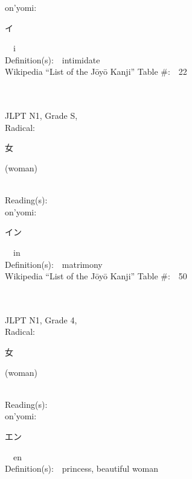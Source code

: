 \begin{multicols}{2}
{\hspace*{1em}}on'yomi:\ \ \\
{\hspace*{2em}}{\begin{CJK}{UTF8}{min} イ \end{CJK}}\ \ i\ \ \\
Definition(s):\ \ intimidate \\
Wikipedia ``List of the J\=oy\=o Kanji'' Table \#:\ \     22 \\
\ \ \\
{\fontsize{34pt}{40pt}  }\ \ \\
{JLPT N1, Grade S, \\Radical:\ \ {\begin{CJK}{UTF8}{min} 女 \end{CJK}} (woman) } \\
Reading(s):\ \ \\
{\hspace*{1em}}on'yomi:\ \ \\
{\hspace*{2em}}{\begin{CJK}{UTF8}{min} イン \end{CJK}}\ \ in\ \ \\
Definition(s):\ \ matrimony \\
Wikipedia ``List of the J\=oy\=o Kanji'' Table \#:\ \ 50 \\
\ \ \\
{\fontsize{34pt}{40pt}  }\ \ \\  %
{JLPT N1, Grade 4, \\Radical:\ \ {\begin{CJK}{UTF8}{min} 女 \end{CJK}} (woman) } \\
Reading(s):\ \ \\
{\hspace*{1em}}on'yomi:\ \ \\
{\hspace*{2em}}{\begin{CJK}{UTF8}{min} エン \end{CJK}}\ \ en\ \ \\
Definition(s):\ \ princess, beautiful woman \\

\end{multicols}

